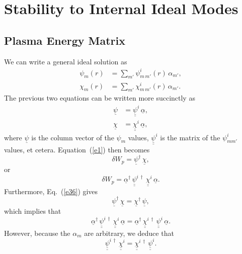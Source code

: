 \documentclass[12pt,prb,aps,notitlepage]{revtex4-1}
\begin{document}
\section{Stability to Internal Ideal Modes}
\subsection{Plasma Energy Matrix}
We can write a general ideal solution as
\begin{align}
\psi_m(r) &= \sum_{m'}\psi_{m\,m'}^i(r)\,\alpha_{m'},\\[0.5ex]
\chi_m(r) &= \sum_{m'}\chi_{m\,m'}^i(r)\,\alpha_{m'}.
\end{align}
The previous two equations can be written more succinctly as
\begin{align}\label{e41}
\underline{\psi}&= \underline{\underline{\psi}}^i\,\underline{\alpha},\\[0.5ex]
\underline{\chi}&= \underline{\underline{\chi}}^i\,\underline{\alpha},\label{e42}
\end{align}
where $\underline{\psi}$ is the column vector of the $\psi_m$ values, $\underline{\underline{\psi}}^i$ is the matrix of the $\psi_{mm'}^i$ values,
et cetera. 
Equation~(\ref{e1}) then becomes
\begin{equation}
\delta W_p= \underline{\psi}^\dag\,\underline{\chi},
\end{equation} 
or
\begin{equation}\label{e44}
\delta W_p = \underline{\alpha}^\dag\,\underline{\underline{\psi}}^{i\,\dag}\,\underline{\underline{\chi}}^i\,\underline{\alpha}.
\end{equation}
Furthermore, Eq.~(\ref{e36}) gives
\begin{equation}
\underline{\psi}^\dag\,\underline{\chi} = \underline{\chi}^\dag\,\underline{\psi},
\end{equation}
which implies that 
\begin{equation}
 \underline{\alpha}^\dag\,\underline{\underline{\psi}}^{i\,\dag}\,\underline{\underline{\chi}}^i\,\underline{\alpha}= 
 \underline{\alpha}^\dag\,\underline{\underline{\chi}}^{i\,\dag}\,\underline{\underline{\psi}}^i\,\underline{\alpha}.
 \end{equation}
 However, because the $\alpha_m$ are arbitrary, we deduce that
 \begin{equation}\label{e47}
 \underline{\underline{\psi}}^{i\,\dag}\,\underline{\underline{\chi}}^i= \underline{\underline{\chi}}^{i\,\dag}\,\underline{\underline{\psi}}^i.
 \end{equation}
\end{document}
